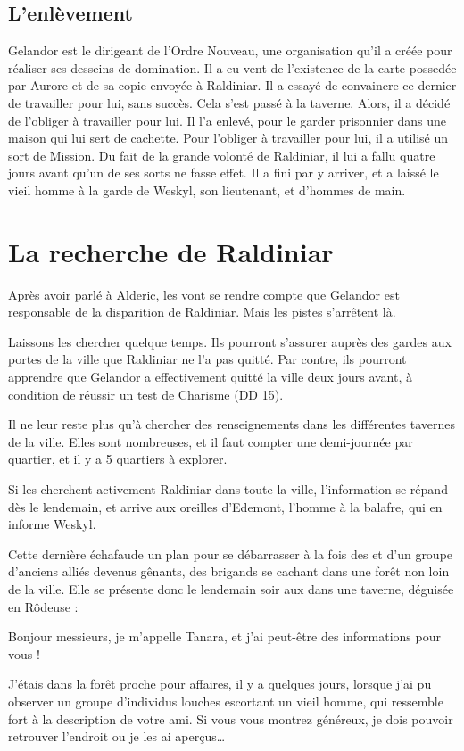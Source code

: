 \documentclass[a4paper,10pt,openany]{book}
\begin{document}
\begin{multicols}{2}
\subsection{L’enlèvement}
Gelandor est le dirigeant de l’Ordre Nouveau, une organisation qu’il a créée pour réaliser ses desseins de domination. Il a eu vent de l’existence de
la carte possedée par Aurore et de sa copie envoyée à Raldiniar. Il a essayé de convaincre ce dernier de travailler pour lui, sans succès. Cela s’est
passé à la taverne. Alors, il a décidé de l’obliger à travailler pour lui. Il l’a enlevé, pour le garder prisonnier dans une maison qui lui sert de
cachette. Pour l’obliger à travailler pour lui, il a utilisé un sort de Mission. Du fait de la grande volonté de Raldiniar, il lui a fallu quatre
jours avant qu’un de ses sorts ne fasse effet. Il a fini par y arriver, et a laissé le vieil homme à la garde de Weskyl, son lieutenant, et d’hommes
de main.

\section{La recherche de Raldiniar}
Après avoir parlé à Alderic, les \PJs vont se rendre compte que Gelandor est responsable de la disparition de Raldiniar. Mais les pistes s’arrêtent
là.\par Laissons les \PJs chercher quelque temps. Ils pourront s’assurer auprès des gardes aux portes de la ville que Raldiniar ne l’a pas quitté. Par
contre, ils pourront apprendre que Gelandor a effectivement quitté la ville deux jours avant, à condition de réussir un test de Charisme (DD 15).\par
Il ne leur reste plus qu’à chercher des renseignements dans les différentes tavernes de la ville. Elles sont nombreuses, et il faut compter une
demi-journée par quartier, et il y a 5 quartiers à explorer. \par Si les \PJs cherchent activement Raldiniar dans toute la ville, l’information se
répand dès le lendemain, et arrive aux oreilles d’Edemont, l’homme à la balafre, qui en informe Weskyl.\par Cette dernière échafaude un plan pour se
débarrasser à la fois des \PJs et d’un groupe d’anciens alliés devenus gênants, des brigands se cachant dans une forêt non loin de la ville. Elle se
présente donc le lendemain soir aux \PJs dans une taverne, déguisée en Rôdeuse :
\begin{paperbox}{ }
	Bonjour messieurs, je m'appelle Tanara, et j'ai peut-être des informations pour vous !\par
	J'étais dans la forêt proche pour affaires, il y a quelques jours, lorsque j'ai pu observer un groupe d'individus louches escortant un vieil homme,
	qui ressemble fort à la description de votre ami. Si vous vous montrez généreux, je dois pouvoir retrouver l'endroit ou je les ai aperçus\ldots
\end{paperbox}

\end{multicols}
\end{document}
